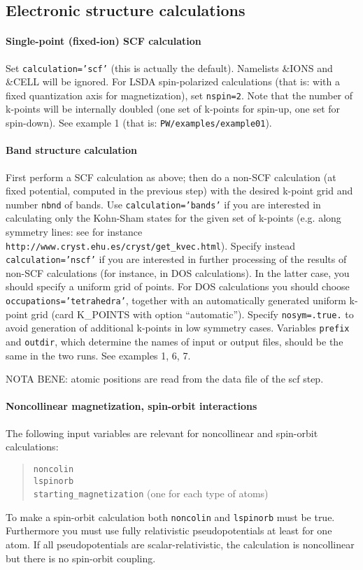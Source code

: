 \documentclass[12pt,a4paper]{article}
\begin{document}
\subsection{Electronic structure calculations}
\paragraph{Single-point (fixed-ion) SCF calculation} 
Set \texttt{calculation='scf'} (this is actually the default).
Namelists \&IONS and \&CELL will be ignored. For LSDA spin-polarized 
calculations (that is: with a fixed quantization axis for magnetization),
set \texttt{nspin=2}. Note that the number of k-points will be internally
doubled (one set of k-points for spin-up, one set for spin-down).
See example 1 (that is: \texttt{PW/examples/example01}).


\paragraph{Band structure calculation}
First perform a SCF calculation as above;
then do a non-SCF calculation (at fixed potential, computed in the
previous step) with the desired k-point grid and  number \texttt{nbnd}
of bands. 
Use \texttt{calculation='bands'} if you are interested in calculating
only the Kohn-Sham states for the given set of k-points
(e.g. along symmetry lines: see for instance
\texttt{http://www.cryst.ehu.es/cryst/get\_kvec.html}). Specify instead
\texttt{calculation='nscf'} if you are interested in further processing 
of the results of non-SCF calculations (for instance, in DOS calculations).
In the latter case, you should specify a uniform grid of points.
For DOS calculations you should choose \texttt{occupations='tetrahedra'}, 
together with an automatically generated uniform k-point grid 
(card K\_POINTS with option ``automatic'').
Specify \texttt{nosym=.true.} to avoid generation of additional k-points in
low symmetry cases. Variables \texttt{prefix} and \texttt{outdir}, which
determine
the names of input or output files, should be the same in the two runs.
See examples 1, 6, 7.

NOTA BENE: atomic positions are read from the data file of the scf step.

\paragraph{Noncollinear magnetization, spin-orbit interactions}

The following input variables are relevant for noncollinear and
spin-orbit calculations: 
\begin{quote}
      \texttt{noncolin}\\
      \texttt{lspinorb}\\
      \texttt{starting\_magnetization} (one for each type of atoms)
\end{quote}
To make a spin-orbit calculation both \texttt{noncolin} and
\texttt{lspinorb} must be true. Furthermore you must use fully
relativistic pseudopotentials at least for one atom. If all
pseudopotentials are scalar-relativistic, the calculation is
noncollinear but there is no spin-orbit coupling.
\end{document}
